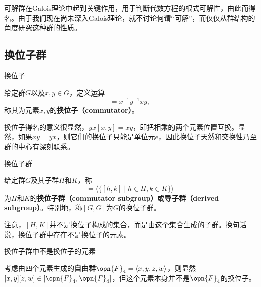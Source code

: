 


可解群在Galois理论中起到关键作用，用于判断代数方程的根式可解性，由此而得名。由于我们现在尚未深入Galois理论，就不讨论何谓“可解”，而仅仅从群结构的角度研究这种群的性质。



\subsection{换位子群}


\begin{definition}{换位子}

给定群$G$以及$x, y\in G$，定义运算
\begin{equation}
[x, y] = x^{-1}y^{-1}xy,~
\end{equation}
称其为元素$x, y$的\textbf{换位子（commutator）}。

\end{definition}


换位子得名的意义很显然，$yx[x, y]=xy$，即把相乘的两个元素位置互换。显然，如果$xy=yx$，则它们的换位子只能是单位元$e$，因此换位子天然和交换性乃至群的中心有深刻联系。


\begin{definition}{换位子群}

给定群$G$及其子群$H$和$K$，称
\begin{equation}
[H, K] = \langle \{[h, k]\mid h\in H, k\in K\} \rangle~
\end{equation}
为$H$和$K$的\textbf{换位子群（commutator subgroup）}或\textbf{导子群（derived subgroup）}。特别地，称$[G, G]$为$G$的换位子群。

\end{definition}

注意，$[H, K]$并不是换位子构成的集合，而是由这个集合生成的子群。换句话说，换位子群中存在不是换位子的元素。

\begin{example}{换位子群中不是换位子的元素}

考虑由四个元素生成的\textbf{自由群}$\opn{F}_4=\langle x, y, z, w \rangle$，则显然$[x, y][z, w]\in [\opn{F}_4, \opn{F}_4]$，但这个元素本身并不是$\opn{F}_4$的换位子。

\end{example}



























